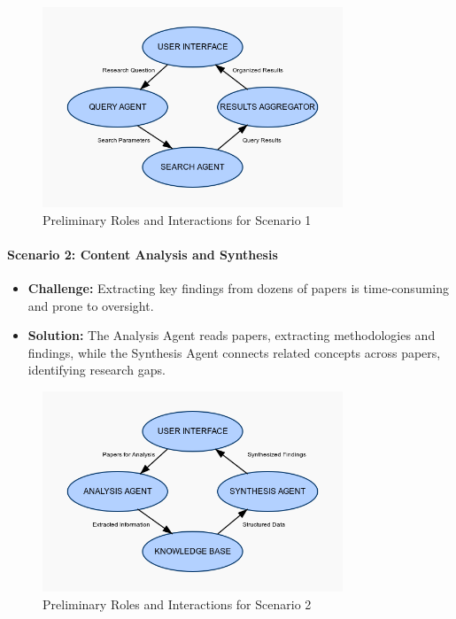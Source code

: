 \documentclass[11pt,a4paper]{article}
\begin{document}
\begin{figure}[H]
    \centering
    \includegraphics[width=0.8\textwidth]{images/preliminary-roles-scenario1.png}
    \caption{Preliminary Roles and Interactions for Scenario 1}
    \label{fig:scenario1}
\end{figure}

\paragraph{Scenario 2: Content Analysis and Synthesis}
\begin{itemize}
    \item \textbf{Challenge:} Extracting key findings from dozens of papers is time-consuming and prone to oversight.
    \item \textbf{Solution:} The Analysis Agent reads papers, extracting methodologies and findings, while the Synthesis Agent connects related concepts across papers, identifying research gaps.
\end{itemize}

\begin{figure}[H]
    \centering
    \includegraphics[width=0.8\textwidth]{images/preliminary-roles-scenario2.png}
    \caption{Preliminary Roles and Interactions for Scenario 2}
    \label{fig:scenario2}
\end{figure}
\end{document}
